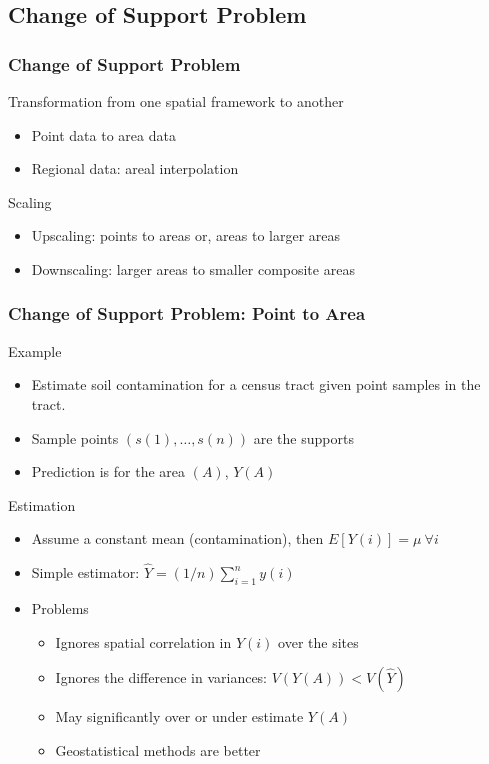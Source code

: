 \documentclass[nototal]{beamer}
\begin{document}
\subsection{Change of Support Problem}
\begin{frame}[<+->]
  \frametitle{Change of Support Problem}
  \begin{block}{Transformation from one spatial framework to another}
    \begin{itemize}
      \item Point data to area data
      \item Regional data: areal interpolation
    \end{itemize}
   \end{block}
   \begin{block}{Scaling}
    \begin{itemize}
      \item Upscaling: points to areas or, areas to larger areas 
      \item Downscaling: larger areas to smaller composite areas
    \end{itemize}
   \end{block}

    \end{frame}

\begin{frame}[<+->]
  \frametitle{Change of Support Problem: Point to Area}

\begin{block}{Example}
     \begin{itemize}
       \item Estimate soil contamination for a census tract given point
	 samples in  the tract.
       \item Sample points $(s(1),\ldots,s(n))$ are the supports
       \item Prediction is for the area $(A)$, $Y(A)$
     \end{itemize}
    \end{block}

\begin{block}{Estimation}
     \begin{itemize}
       \item Assume a constant mean (contamination), then $E[Y(i)]=\mu \ \forall i$ 
       \item Simple estimator: $\hat{Y} = (1/n) \sum_{i=1}^n y(i)$
       \item Problems
	 \begin{itemize}
	   \item Ignores spatial correlation in $Y(i)$ over the sites
	   \item Ignores the difference in variances: $V(Y(A)) < V(\hat{Y})$
	   \item May significantly over or under estimate $Y(A)$
	   \item Geostatistical methods are better
	 \end{itemize}
     \end{itemize}
    \end{block}
  \end{frame}
 
\end{document}
